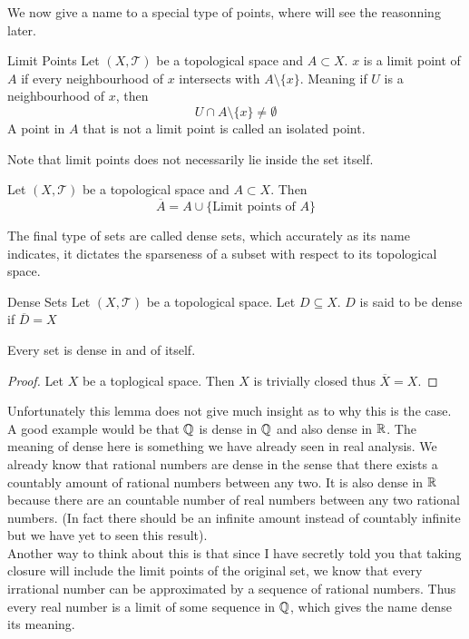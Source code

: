 \documentclass[a4paper]{article}
\begin{document}
We now give a name to a special type of points, where will see the reasonning later. 

\begin{defn}{Limit Points}{} Let $(X,\mathcal{T})$ be a topological space and $A\subset X$. $x$ is a limit point of $A$ if every neighbourhood of $x$ intersects with $A\setminus\{x\}$. Meaning if $U$ is a neighbourhood of $x$, then $$U\cap A\setminus\{x\}\neq\emptyset$$ A point in $A$ that is not a limit point is called an isolated point. 
\end{defn}

Note that limit points does not necessarily lie inside the set itself. 

\begin{prp}{}{} Let $(X,\mathcal{T})$ be a topological space and $A\subset X$. Then $$\overline{A}=A\cup\{\text{Limit points of }A\}$$
\end{prp}

The final type of sets are called dense sets, which accurately as its name indicates, it dictates the sparseness of a subset with respect to its topological space. 

\begin{defn}{Dense Sets}{} Let $(X,\mathcal{T})$ be a topological space. Let $D\subseteq X$. $D$ is said to be dense if $\overline{D}=X$
\end{defn}

\begin{lmm}{}{} Every set is dense in and of itself. 
\begin{proof}
Let $X$ be a toplogical space. Then $X$ is trivially closed thus $\overline{X}=X$. 
\end{proof}
\end{lmm}

Unfortunately this lemma does not give much insight as to why this is the case. A good example would be that $\mathbb{Q}$ is dense in $\mathbb{Q}$ and also dense in $\mathbb{R}$. The meaning of dense here is something we have already seen in real analysis. We already know that rational numbers are dense in the sense that there exists a countably amount of rational numbers between any two. It is also dense in $\mathbb{R}$ because there are an countable number of real numbers between any two rational numbers. (In fact there should be an infinite amount instead of countably infinite but we have yet to seen this result). \\
Another way to think about this is that since I have secretly told you that taking closure will include the limit points of the original set, we know that every irrational number can be approximated by a sequence of rational numbers. Thus every real number is a limit of some sequence in $\mathbb{Q}$, which gives the name dense its meaning. 
\end{document}
